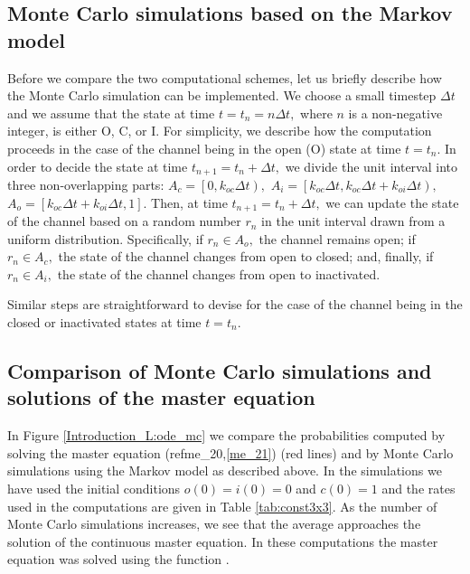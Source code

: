 \subsection[Monte Carlo Simulations]{Monte Carlo simulations based on the Markov model}
\label{MCSMM}

Before we compare the two computational schemes, let us briefly describe how
the Monte Carlo simulation can be implemented. We choose a small timestep
$\Delta t$ and we assume that the state at time $t=t_{n}=n\Delta t,$ where $n$
is a non-negative integer, is either O, C, or I. For simplicity, we describe how
the computation proceeds in the case of the channel being in the open (O)
state at time $t=t_{n}$. In order to decide the state at time $t_{n+1}=t_{n}+\Delta t,$ we
divide the unit interval into three non-overlapping parts:  $A_{c}=\left[
0,k_{oc}\Delta t\right)  ,$ $A_{i}=\left[  k_{oc}\Delta t,k_{oc}\Delta
t+k_{oi}\Delta t\right)  ,$ $A_{o}=\left[  k_{oc}\Delta t+k_{oi}\Delta
t,1\right]  .$ Then, at time $t_{n+1}=t_{n}+\Delta t,$ we can update the state
of the channel based on a random number $r_{n}$ in the unit interval drawn from
a uniform distribution. Specifically, if $r_{n}\in A_{o},$ the channel
remains open; if $r_{n}\in A_{c},$ the state of the channel changes from
open to closed; and, finally, if $r_{n}\in A_{i},$ the state of the channel
changes from open to inactivated.

Similar steps are straightforward to
devise for the case of the channel being in the closed or inactivated states
at time $t=t_{n}.$



\subsection[Monte Carlo simulation vs Master Equation]{Comparison of Monte Carlo simulations and solutions of the
master equation}

In Figure \ref{Introduction_L:ode_mc} we compare the probabilities computed by solving the master equation (ref{me_20},\ref{me_21}) (red lines) and by Monte Carlo simulations using the Markov model as described above. In the simulations we have used the initial conditions $o(0)=i(0)=0$
and $c(0)=1$ and the rates used in the computations are given in Table \ref{tab:const3x3}. As the number of Monte Carlo simulations increases, we see that the average approaches the solution of the continuous master equation. In these computations the master equation was solved using the function .


